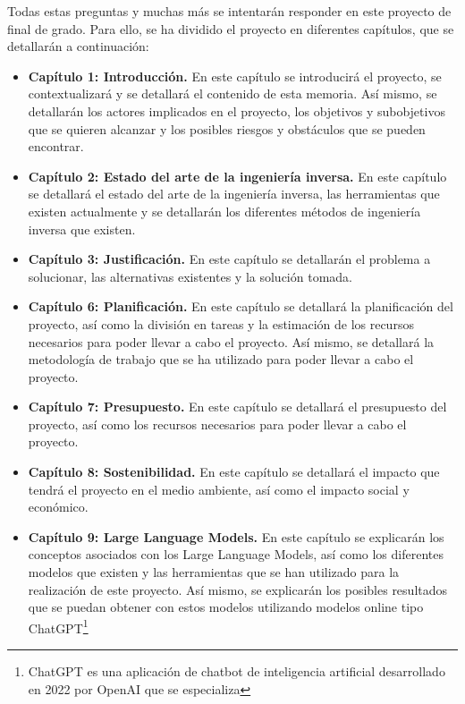 Todas estas preguntas y muchas más se intentarán responder en este proyecto de final
de grado. Para ello, se ha dividido el proyecto en diferentes capítulos, que se
detallarán a continuación:

\begin{itemize}
    \item \textbf{Capítulo 1: Introducción.} En este capítulo se introducirá el proyecto,
        se contextualizará y se detallará el contenido de esta memoria. Así mismo, se
        detallarán los actores implicados en el proyecto, los objetivos y subobjetivos
        que se quieren alcanzar y los posibles riesgos y obstáculos que se pueden encontrar.
    \item \textbf{Capítulo 2: Estado del arte de la ingeniería inversa.} En este capítulo
        se detallará el estado del arte de la ingeniería inversa, las herramientas que
        existen actualmente y se detallarán los diferentes métodos de ingeniería inversa 
        que existen.
    \item \textbf{Capítulo 3: Justificación.} En este capítulo se detallarán el problema
        a solucionar, las alternativas existentes y la solución tomada.
    \item \textbf{Capítulo 6: Planificación.} En este capítulo se detallará la planificación
        del proyecto, así como la división en tareas y la estimación de los recursos
        necesarios para poder llevar a cabo el proyecto. Así mismo, se detallará la
        metodología de trabajo que se ha utilizado para poder llevar a cabo el proyecto.
    \item \textbf{Capítulo 7: Presupuesto.} En este capítulo se detallará el presupuesto
        del proyecto, así como los recursos necesarios para poder llevar a cabo el proyecto.
    \item \textbf{Capítulo 8: Sostenibilidad.} En este capítulo se detallará el impacto
        que tendrá el proyecto en el medio ambiente, así como el impacto social y económico.
    \item \textbf{Capítulo 9: Large Language Models.} En este capítulo se explicarán los
        conceptos asociados con los Large Language Models, así como los diferentes modelos
        que existen y las herramientas que se han utilizado para la realización de este
        proyecto. Así mismo, se explicarán los posibles resultados que se puedan obtener con
        estos modelos utilizando modelos online tipo ChatGPT\footnote{ChatGPT es una aplicación
        de chatbot de inteligencia artificial desarrollado en 2022 por OpenAI que se especializa
}
\end{itemize}
